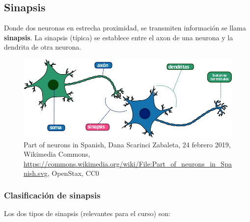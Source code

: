 \subsection{Sinapsis}

 Donde dos neuronas en estrecha proximidad, se transmiten información se llama \textbf{sinapsis}. La sinapsis (típica) se establece entre el axon de una neurona y la dendrita de otra neurona. \parencite{sistemaNervioso}%



\begin{figure}[h]
 \centering
 \includegraphics[scale=0.5]{../Figuras/Part_of_neurons_in_Spanish.png}
 \caption{Part of neurons in Spanish, Dana Scarinci Zabaleta, 24 febrero 2019, Wikimedia Commons, \url{https://commons.wikimedia.org/wiki/File:Part_of_neurons_in_Spanish.svg}, OpenStax, CC0}
 \label{fig:sinapsisN}
\end{figure}


\subsubsection{Clasificación de sinapsis}

Los dos tipos de sinapsis (relevantes para el curso) son:

